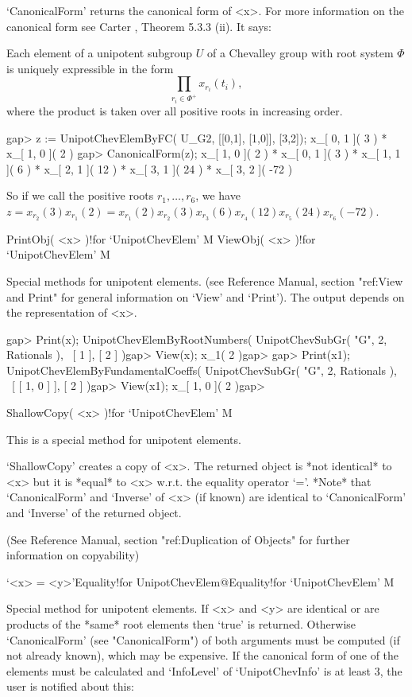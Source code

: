 `CanonicalForm'  returns the  canonical form of <x>. For more information
on the canonical form  see Carter \cite{Car72}, Theorem 5.3.3 (ii). It
says:

Each  element of  a unipotent subgroup $U$ of a Chevalley group with root
system $\Phi$ is uniquely expressible in the form
$$
\prod_{r_i\in\Phi^+} x_{r_i}(t_i),
$$
where the product is taken over all positive roots in increasing order.

\beginexample
gap> z := UnipotChevElemByFC( U_G2, [[0,1], [1,0]], [3,2]);
x_{[ 0, 1 ]}( 3 ) * x_{[ 1, 0 ]}( 2 )
gap> CanonicalForm(z);
x_{[ 1, 0 ]}( 2 ) * x_{[ 0, 1 ]}( 3 ) * x_{[ 1, 1 ]}( 6 ) *
x_{[ 2, 1 ]}( 12 ) * x_{[ 3, 1 ]}( 24 ) * x_{[ 3, 2 ]}( -72 )
\endexample

So  if  we  call  the  positive  roots  $r_1,\dots,r_6$,  we  have  $ z =
x_{r_2}(3)x_{r_1}(2) = x_{r_1}( 2 ) x_{r_2}( 3 ) x_{r_3}( 6 ) x_{r_4}( 12
) x_{r_5}( 24 ) x_{r_6}( -72 )$.


\>PrintObj( <x> )!{for `UnipotChevElem'} M
\>ViewObj( <x> )!{for `UnipotChevElem'} M

Special  methods for  unipotent elements. (see {\GAP}  Reference  Manual,
section  "ref:View  and  Print"  for  general  information on  `View' and
`Print'). The output depends on the representation of <x>.


\beginexample
gap> Print(x);
UnipotChevElemByRootNumbers( UnipotChevSubGr( "G", 2, Rationals ), \
[ 1 ], [ 2 ] )gap> View(x);
x_{1}( 2 )gap>
\endexample
\beginexample
gap> Print(x1);
UnipotChevElemByFundamentalCoeffs( UnipotChevSubGr( "G", 2, Rationals ), \
[ [ 1, 0 ] ], [ 2 ] )gap> View(x1);
x_{[ 1, 0 ]}( 2 )gap>
\endexample

\>ShallowCopy( <x> )!{for `UnipotChevElem'} M

This is a special method for unipotent elements.

`ShallowCopy'  creates  a  copy  of  <x>.  The  returned  object is  *not
identical* to <x> but it  is *equal* to <x> w.r.t. the  equality operator
`='. *Note* that `CanonicalForm' and  `Inverse'  of  <x>  (if known)  are
identical to `CanonicalForm' and `Inverse' of the returned object.

(See {\GAP} Reference  Manual,  section "ref:Duplication of Objects"  for
further information on copyability)

\>`<x> = <y>'{Equality!for UnipotChevElem}@{Equality!for `UnipotChevElem'} M
\indextt{\\=}

Special  method  for unipotent elements. If <x> and <y> are identical  or
are  products of  the  *same* root  elements  then  `true'  is  returned.
Otherwise `CanonicalForm' (see "CanonicalForm") of both arguments must be
computed (if not already known), which may be expensive. If the canonical
form of one  of  the  elements  must be  calculated  and  `InfoLevel'  of
`UnipotChevInfo' is at least 3, the user is notified about this:


